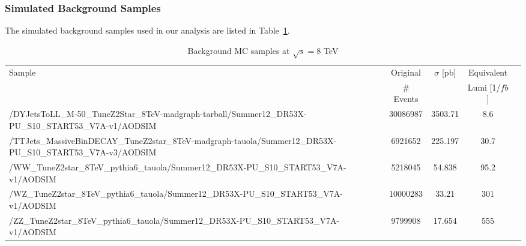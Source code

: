 \documentclass[12pt]{article}
\begin{document}

\subsubsection{Simulated Background Samples}

The simulated background samples used in our analysis are listed in 
Table~\ref{tab:BGSamples8TeV}.

\begin{table}[h]
\begin{center}
\caption{\label{tab:BGSamples8TeV} Background MC samples at $\sqrt{s}=8$ TeV}
\begin{tabular}{|p{10cm}|c|c|c|c|} \hline
Sample & Original  & $\sigma$ [pb] & Equivalent \\
 &  \# Events &  &  Lumi [1/$fb$] \\
\hline
\hline
\scriptsize/DYJetsToLL\_M-50\_TuneZ2Star\_8TeV-madgraph-tarball/Summer12\_DR53X-PU\_S10\_START53\_V7A-v1/AODSIM &	     30086987 &	  3503.71 &   8.6  \\
\hline                                                                                                                                     
\scriptsize/TTJets\_MassiveBinDECAY\_TuneZ2star\_8TeV-madgraph-tauola/Summer12\_DR53X-PU\_S10\_START53\_V7A-v3/AODSIM &  6921652 &	  225.197 &  30.7  \\
\hline                                                                                                                                                       
\scriptsize/WW\_TuneZ2star\_8TeV\_pythia6\_tauola/Summer12\_DR53X-PU\_S10\_START53\_V7A-v1/AODSIM & 	              5218045 &	   54.838 &  95.2  \\
\hline                                                                                                                                     
\scriptsize/WZ\_TuneZ2star\_8TeV\_pythia6\_tauola/Summer12\_DR53X-PU\_S10\_START53\_V7A-v1/AODSIM &	             10000283 &	    33.21 & 301    \\
\hline                                                                                                                                     
\scriptsize/ZZ\_TuneZ2star\_8TeV\_pythia6\_tauola/Summer12\_DR53X-PU\_S10\_START53\_V7A-v1/AODSIM 	&  	              9799908 &    17.654 & 555	   \\
\hline
\end{tabular}
\end{center}
\end{table}
\end{document}
